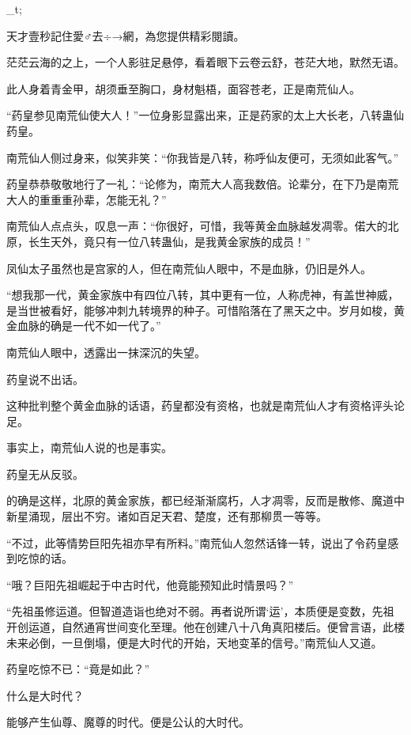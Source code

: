 
\begin{this_body}

\_t;

天才壹秒記住愛♂去÷→網，為您提供精彩閱讀。

茫茫云海的之上，一个人影驻足悬停，看着眼下云卷云舒，苍茫大地，默然无语。

此人身着青金甲，胡须垂至胸口，身材魁梧，面容苍老，正是南荒仙人。

“药皇参见南荒仙使大人！”一位身影显露出来，正是药家的太上大长老，八转蛊仙药皇。

南荒仙人侧过身来，似笑非笑：“你我皆是八转，称呼仙友便可，无须如此客气。”

药皇恭恭敬敬地行了一礼：“论修为，南荒大人高我数倍。论辈分，在下乃是南荒大人的重重重孙辈，怎能无礼？”

南荒仙人点点头，叹息一声：“你很好，可惜，我等黄金血脉越发凋零。偌大的北原，长生天外，竟只有一位八转蛊仙，是我黄金家族的成员！”

凤仙太子虽然也是宫家的人，但在南荒仙人眼中，不是血脉，仍旧是外人。

“想我那一代，黄金家族中有四位八转，其中更有一位，人称虎神，有盖世神威，是当世被看好，能够冲刺九转境界的种子。可惜陷落在了黑天之中。岁月如梭，黄金血脉的确是一代不如一代了。”

南荒仙人眼中，透露出一抹深沉的失望。

药皇说不出话。

这种批判整个黄金血脉的话语，药皇都没有资格，也就是南荒仙人才有资格评头论足。

事实上，南荒仙人说的也是事实。

药皇无从反驳。

的确是这样，北原的黄金家族，都已经渐渐腐朽，人才凋零，反而是散修、魔道中新星涌现，层出不穷。诸如百足天君、楚度，还有那柳贯一等等。

“不过，此等情势巨阳先祖亦早有所料。”南荒仙人忽然话锋一转，说出了令药皇感到吃惊的话。

“哦？巨阳先祖崛起于中古时代，他竟能预知此时情景吗？”

“先祖虽修运道。但智道造诣也绝对不弱。再者说所谓‘运’，本质便是变数，先祖开创运道，自然通宵世间变化至理。他在创建八十八角真阳楼后。便曾言语，此楼未来必倒，一旦倒塌，便是大时代的开始，天地变革的信号。”南荒仙人又道。

药皇吃惊不已：“竟是如此？”

什么是大时代？

能够产生仙尊、魔尊的时代。便是公认的大时代。


\end{this_body}
